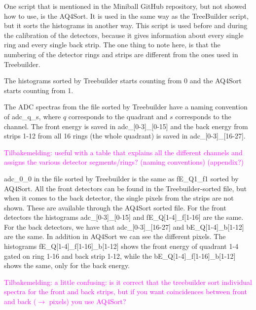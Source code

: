 \documentclass[twoside,english]{uiofysmaster/uiofysmaster}
\begin{document}
One script that is mentioned in the Miniball GitHub repository, but not showed how to use, is the AQ4Sort. It is used in the same way as the TreeBuilder script, but it sorts the histograms in another way. 
This script is used before and during the calibration of the detectors, because it gives information about every single ring and every single back strip. The one thing to note here, is that the numbering of the detector rings and strips are different from the ones used in Treebuilder. 


The histograms sorted by Treebuilder starts counting from 0 and the AQ4Sort starts counting from 1. 

The ADC spectras from the file sorted by Treebuilder have a naming convention of adc\_q\_s, where $q$ corresponds to the quadrant and $s$ corresponds to the channel. The front energy is saved in adc\_[0-3]\_[0-15] and the back energy from strips 1-12 from all 16 rings (the whole quadrant) is saved in adc\_[0-3]\_[16-27].

\textcolor{Magenta}{Tilbakemelding: \newline 
useful with a table that explains all the different channels and assigns the various detector segments/rings? (naming conventions) (appendix?)
}

\begin{table}[ht] 
	\centering 
	
\end{table}

adc\_0\_0 in the file sorted by Treebuilder is the same as fE\_Q1\_f1 sorted by AQ4Sort. All the front detectors can be found in the Treebuilder-sorted file, but when it comes to the back detector, the single pixels from the strips are not shown. These are available through the AQ4Sort sorted file. For the front detectors the histograms adc\_[0-3]\_[0-15] and fE\_Q[1-4]\_f[1-16] are the same. For the back detectors, we have that adc\_[0-3]\_[16-27] and bE\_Q[1-4]\_b[1-12] are the same. In addition in AQ4Sort we can see the different pixels. The histograms fE\_Q[1-4]\_f[1-16]\_b[1-12] shows the front energy of quadrant 1-4 gated on ring 1-16 and back strip 1-12, while the bE\_Q[1-4]\_f[1-16]\_b[1-12] shows the same, only for the back energy. 

\textcolor{Magenta}{Tilbakemelding: \newline 
a little confusing: is it correct that the treebuilder sort individual spectra for the front and back strips, but if you want coincidences between front and back ($\rightarrow$ pixels) you use AQ4Sort?
}
\end{document}
